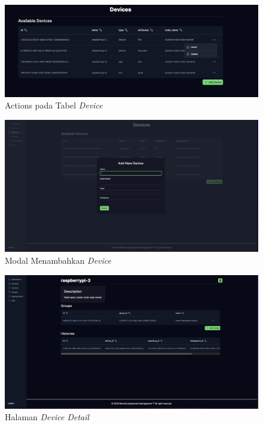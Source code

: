 \begin{figure}[h]
  \centering
  \includegraphics[width=1\textwidth]{resources/chapter-4/dashboard/device-page-actions.jpg}
  \caption{Actions pada Tabel \textit{Device}}
  \label{fig:halaman-device-actions}
\end{figure}

\begin{figure}[h]
  \centering
  \includegraphics[width=1\textwidth]{resources/chapter-4/dashboard/device-page-add.jpg}
  \caption{Modal Menambahkan \textit{Device}}
  \label{fig:halaman-device-add}
\end{figure}

\begin{figure}[h]
  \centering
  \includegraphics[width=1\textwidth]{resources/chapter-4/dashboard/device-detail-page.jpg}
  \caption{Halaman \textit{Device Detail}}
  \label{fig:halaman-device-detail}
\end{figure}

